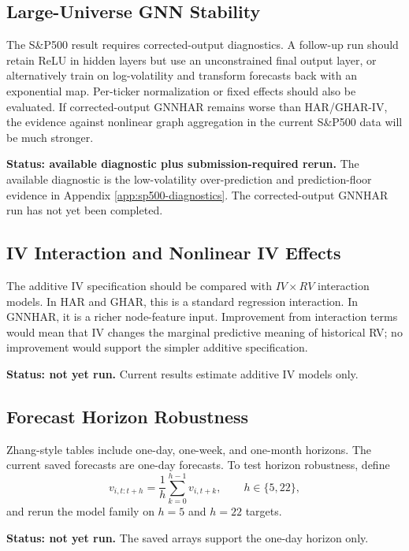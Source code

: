 \documentclass[11pt,a4paper]{article}
\begin{document}
\subsection{Large-Universe GNN Stability}
\label{subsec:large-gnn}

The S\&P500 result requires corrected-output diagnostics.  A follow-up run should retain ReLU in hidden layers but use an unconstrained final output layer, or alternatively train on log-volatility and transform forecasts back with an exponential map.  Per-ticker normalization or fixed effects should also be evaluated.  If corrected-output GNNHAR remains worse than HAR/GHAR-IV, the evidence against nonlinear graph aggregation in the current S\&P500 data will be much stronger.

\textbf{Status: available diagnostic plus submission-required rerun.}  The available diagnostic is the low-volatility over-prediction and prediction-floor evidence in Appendix \ref{app:sp500-diagnostics}.  The corrected-output GNNHAR run has not yet been completed.

\subsection{IV Interaction and Nonlinear IV Effects}
\label{subsec:iv-interaction-robust}

The additive IV specification should be compared with \(IV\times RV\) interaction models.  In HAR and GHAR, this is a standard regression interaction.  In GNNHAR, it is a richer node-feature input.  Improvement from interaction terms would mean that IV changes the marginal predictive meaning of historical RV; no improvement would support the simpler additive specification.

\textbf{Status: not yet run.}  Current results estimate additive IV models only.

\subsection{Forecast Horizon Robustness}
\label{subsec:horizon}

Zhang-style tables include one-day, one-week, and one-month horizons.  The current saved forecasts are one-day forecasts.  To test horizon robustness, define
\[
v_{i,t:t+h}
=
\frac{1}{h}\sum_{k=0}^{h-1}v_{i,t+k},
\qquad h\in\{5,22\},
\]
and rerun the model family on \(h=5\) and \(h=22\) targets.

\textbf{Status: not yet run.}  The saved arrays support the one-day horizon only.
\end{document}
